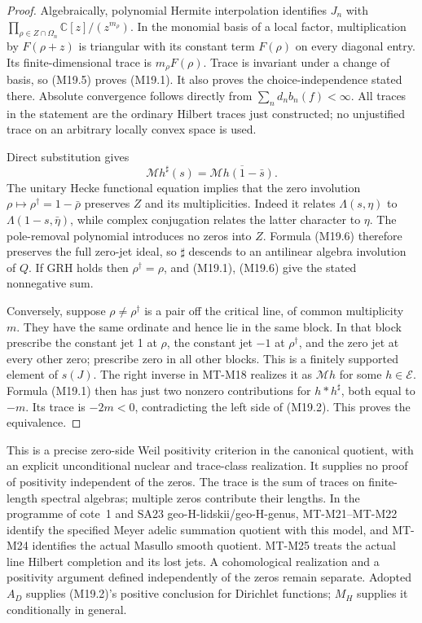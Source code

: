 \documentclass[11pt,a4paper]{article}
\begin{document}
\begin{proof}
Algebraically, polynomial Hermite interpolation identifies
\(J_n\) with
\(\prod_{\rho\in Z\cap\Omega_n}\mathbb C[z]/(z^{m_\rho})\).
In the monomial basis of a local factor, multiplication by
\(F(\rho+z)\) is triangular with its constant term
\(F(\rho)\) on every diagonal entry. Its finite-dimensional
trace is \(m_\rho F(\rho)\). Trace is invariant under a
change of basis, so (M19.5) proves (M19.1). It also proves
the choice-independence stated there. Absolute convergence
follows directly from
\(\sum_n d_n b_n(f)<\infty\). All traces in the statement
are the ordinary Hilbert traces just constructed; no
unjustified trace on an arbitrary locally convex space is used.

Direct substitution gives
\[
 \mathcal Mh^\sharp(s)
       =\overline{\mathcal Mh(1-\bar s)}.              \tag{M19.6}
\]
The unitary Hecke functional equation implies that the zero
involution \(\rho\mapsto\rho^\dagger=1-\bar\rho\)
preserves \(Z\) and its multiplicities. Indeed it relates
\(\Lambda(s,\eta)\) to \(\Lambda(1-s,\bar\eta)\),
while complex conjugation relates the latter character to
\(\eta\). The pole-removal polynomial introduces no zeros
into \(Z\). Formula (M19.6) therefore preserves the full
zero-jet ideal, so \(\sharp\) descends to an antilinear
algebra involution of \(Q\). If GRH holds then \(\rho^\dagger=\rho\),
and (M19.1), (M19.6) give the stated nonnegative sum.

Conversely, suppose \(\rho\ne\rho^\dagger\) is a pair
off the critical line, of common multiplicity \(m\).
They have the same ordinate and hence lie in the same
block. In that block prescribe the constant jet 1 at
\(\rho\), the constant jet \(-1\) at \(\rho^\dagger\),
and the zero jet at every other zero; prescribe zero in
all other blocks. This is a finitely supported element
of \(s(J)\). The right inverse in MT-M18 realizes it as
\(\mathcal Mh\) for some \(h\in\mathcal E\). Formula
(M19.1) then has just two nonzero contributions for
\(h*h^\sharp\), both equal to \(-m\). Its trace is
\(-2m<0\), contradicting the left side of (M19.2).
This proves the equivalence.
\end{proof}

This is a precise zero-side Weil positivity criterion in
the canonical quotient, with an explicit unconditional
nuclear and trace-class realization. It supplies no proof
of positivity independent of the zeros. The trace is the
sum of traces on finite-length spectral algebras; multiple
zeros contribute their lengths. In the programme of
cote~1 and SA23 geo-H-lidskii/geo-H-genus, MT-M21--MT-M22 identify the specified Meyer adelic summation
quotient with this model, and MT-M24 identifies the actual
Masullo smooth quotient. MT-M25 treats the actual line Hilbert
completion and its lost jets. A cohomological realization and
a positivity argument defined independently of the zeros remain separate. Adopted \(A_D\)
supplies (M19.2)'s positive conclusion for Dirichlet
functions; \(M_H\) supplies it conditionally in general.
\end{document}
